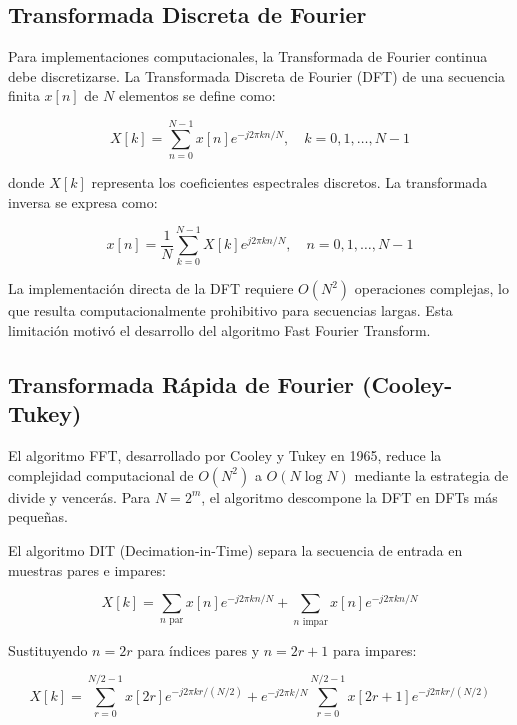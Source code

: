 \documentclass[a4paper]{article}
\begin{document}
\subsection{Transformada Discreta de Fourier}

Para implementaciones computacionales, la Transformada de Fourier continua debe discretizarse. La Transformada Discreta de Fourier
(DFT) de una secuencia finita $x[n]$ de $N$ elementos se define como:

\begin{equation}
    X[k] = \sum_{n=0}^{N-1} x[n] e^{-j2\pi kn/N}, \quad k = 0, 1, \ldots, N-1
\end{equation}

donde $X[k]$ representa los coeficientes espectrales discretos. La transformada inversa se expresa como:

\begin{equation}
    x[n] = \frac{1}{N} \sum_{k=0}^{N-1} X[k] e^{j2\pi kn/N}, \quad n = 0, 1, \ldots, N-1
\end{equation}

La implementación directa de la DFT requiere $O(N^2)$ operaciones complejas, lo que resulta computacionalmente prohibitivo para
secuencias largas. Esta limitación motivó el desarrollo del algoritmo Fast Fourier Transform.

\subsection{Transformada Rápida de Fourier (Cooley-Tukey)}

El algoritmo FFT, desarrollado por Cooley y Tukey en 1965, reduce la complejidad computacional de $O(N^2)$ a $O(N \log N)$ mediante
la estrategia de divide y vencerás. Para $N = 2^m$, el algoritmo descompone la DFT en DFTs más pequeñas.

El algoritmo DIT (Decimation-in-Time) separa la secuencia de entrada en muestras pares e impares:

\begin{equation}
    X[k] = \sum_{n \text{ par}} x[n] e^{-j2\pi kn/N} + \sum_{n \text{ impar}} x[n] e^{-j2\pi kn/N}
\end{equation}

Sustituyendo $n = 2r$ para índices pares y $n = 2r+1$ para impares:

\begin{equation}
    X[k] = \sum_{r=0}^{N/2-1} x[2r] e^{-j2\pi kr/(N/2)} + e^{-j2\pi k/N} \sum_{r=0}^{N/2-1} x[2r+1] e^{-j2\pi kr/(N/2)}
\end{equation}
\end{document}
